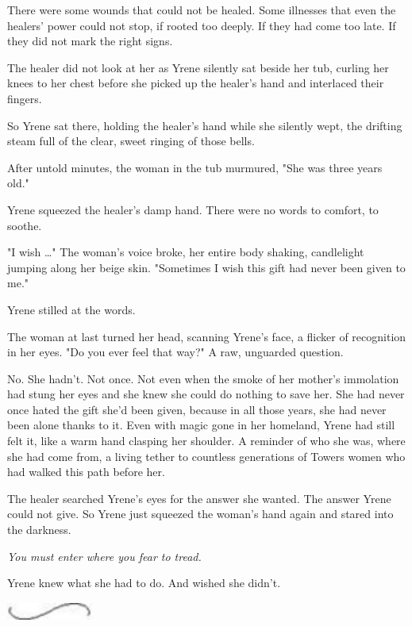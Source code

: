There were some wounds that could not be healed.
Some illnesses that even the healers' power could not stop, if rooted too deeply.
If they had come too late.
If they did not mark the right signs.

The healer did not look at her as Yrene silently sat beside her tub, curling her knees to her chest before she picked up the healer's hand and interlaced their fingers.

So Yrene sat there, holding the healer's hand while she silently wept, the drifting steam full of the clear, sweet ringing of those bells.

After untold minutes, the woman in the tub murmured, "She was three years old."

Yrene squeezed the healer's damp hand.
There were no words to comfort, to soothe.

"I wish \ldots" The woman's voice broke, her entire body shaking, candlelight jumping along her beige skin.
"Sometimes I wish this gift had never been given to me."

Yrene stilled at the words.

The woman at last turned her head, scanning Yrene's face, a flicker of recognition in her eyes.
"Do you ever feel that way?"
A raw, unguarded question.

No.
She hadn't.
Not once.
Not even when the smoke of her mother's immolation had stung her eyes and she knew she could do nothing to save her.
She had never once hated the gift she'd been given, because in all those years, she had never been alone thanks to it.
Even with magic gone in her homeland, Yrene had still felt it, like a warm hand clasping her shoulder.
A reminder of who she was, where she had come from, a living tether to countless generations of Towers women who had walked this path before her.

The healer searched Yrene's eyes for the answer she wanted.
The answer Yrene could not give.
So Yrene just squeezed the woman's hand again and stared into the darkness.

\emph{You must enter where you fear to tread.}

Yrene knew what she had to do.
And wished she didn't.

\begin{center}
	\includegraphics[width=1.12in,height=0.24in]{images/seperator}
\end{center}

